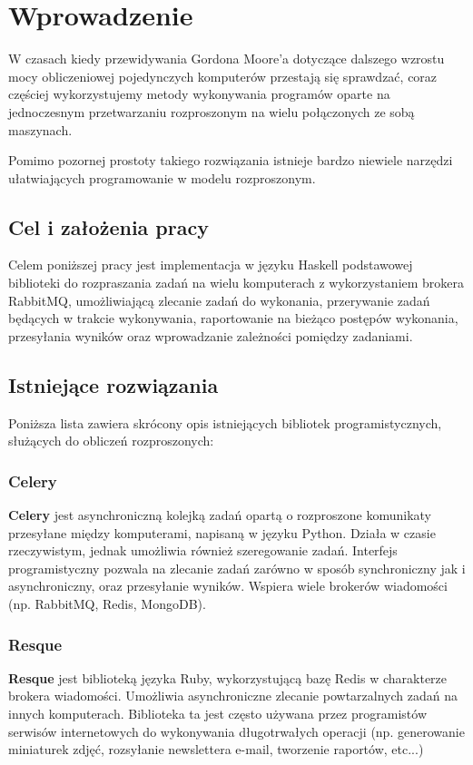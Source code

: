 
\chapter{Wprowadzenie}
\label{cha:wprowadzenie}
W czasach kiedy przewidywania Gordona Moore'a dotyczące dalszego wzrostu mocy obliczeniowej pojedynczych komputerów przestają się sprawdzać, coraz częściej wykorzystujemy metody wykonywania programów oparte na jednoczesnym przetwarzaniu rozproszonym na wielu połączonych ze sobą maszynach. 

Pomimo pozornej prostoty takiego rozwiązania istnieje bardzo niewiele narzędzi ułatwiających programowanie w modelu rozproszonym.

\section{Cel i założenia pracy}
\label{sec:celePracy}
Celem poniższej pracy jest implementacja w języku Haskell podstawowej biblioteki do rozpraszania zadań na wielu komputerach z wykorzystaniem brokera RabbitMQ, umożliwiającą zlecanie zadań do wykonania, przerywanie zadań będących w trakcie wykonywania, raportowanie na bieżąco postępów wykonania, przesyłania wyników oraz wprowadzanie zależności pomiędzy zadaniami.

\section{Istniejące rozwiązania}
\label{sec:celePracy}
Poniższa lista zawiera skrócony opis istniejących bibliotek programistycznych, służących do obliczeń rozproszonych:
\subsection{Celery}
\label{ssec:celery}
\textbf{Celery} jest asynchroniczną kolejką zadań opartą o rozproszone komunikaty przesyłane między komputerami, napisaną w języku Python. Działa w czasie rzeczywistym, jednak umożliwia również szeregowanie zadań. Interfejs programistyczny pozwala na zlecanie zadań zarówno w sposób synchroniczny jak i asynchroniczny, oraz przesyłanie wyników. Wspiera wiele brokerów wiadomości (np. RabbitMQ, Redis, MongoDB). 

\subsection{Resque}
\label{ssec:resque}
\textbf{Resque} jest biblioteką języka Ruby, wykorzystującą bazę Redis w charakterze brokera wiadomości. Umożliwia asynchroniczne zlecanie powtarzalnych zadań na innych komputerach. Biblioteka ta jest często używana przez programistów serwisów internetowych do wykonywania długotrwałych operacji (np. generowanie miniaturek zdjęć, rozsyłanie newslettera e-mail, tworzenie raportów, etc...) 

